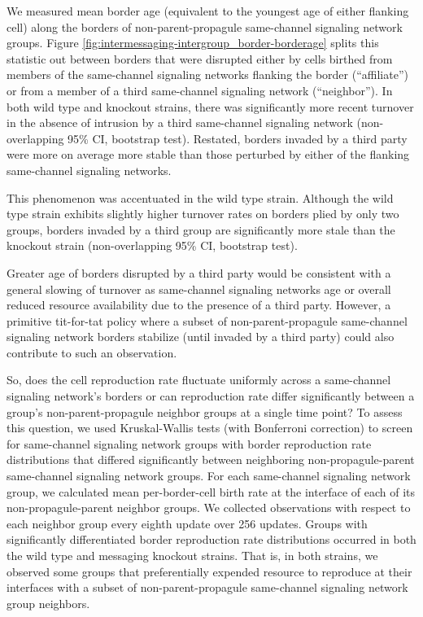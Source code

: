 We measured mean border age (equivalent to the youngest age of either flanking cell) along the borders of non-parent-propagule same-channel signaling network groups.
Figure \ref{fig:intermessaging-intergroup_border-borderage} splits this statistic out between borders that were disrupted either by cells birthed from members of the same-channel signaling networks flanking the border (``affiliate'') or from a member of a third same-channel signaling network (``neighbor'').
In both wild type and knockout strains, there was significantly more recent turnover in the absence of intrusion by a third same-channel signaling network (non-overlapping 95\% CI, bootstrap test).
Restated, borders invaded by a third party were more on average more stable than those perturbed by either of the flanking same-channel signaling networks.

This phenomenon was accentuated in the wild type strain.
Although the wild type strain exhibits slightly higher turnover rates on borders plied by only two groups, borders invaded by a third group are significantly more stale than the knockout strain (non-overlapping 95\% CI, bootstrap test).

Greater age of borders disrupted by a third party would be consistent with a general slowing of turnover as same-channel signaling networks age or overall reduced resource availability due to the presence of a third party.
However, a primitive tit-for-tat policy where a subset of non-parent-propagule same-channel signaling network borders stabilize (until invaded by a third party) could also contribute to such an observation.

So, does the cell reproduction rate fluctuate uniformly across a same-channel signaling network's borders or can reproduction rate differ significantly between a group's non-parent-propagule neighbor groups at a single time point?
To assess this question, we used Kruskal-Wallis tests (with Bonferroni correction) to screen for same-channel signaling network groups with border reproduction rate distributions that differed significantly between neighboring non-propagule-parent same-channel signaling network groups.
For each same-channel signaling network group, we calculated mean per-border-cell birth rate at the interface of each of its non-propagule-parent neighbor groups.
We collected observations with respect to each neighbor group every eighth update over 256 updates.
Groups with significantly differentiated border reproduction rate distributions occurred in both the wild type and messaging knockout strains.
That is, in both strains, we observed some groups that preferentially expended resource to reproduce at their interfaces with a subset of non-parent-propagule same-channel signaling network group neighbors.

